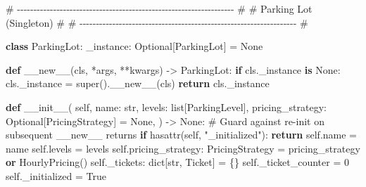 \documentclass[11pt]{article}
\newenvironment{Shaded}{\begin{snugshade}}{\end{snugshade}}
\newcommand{\BuiltInTok}[1]{\textcolor[rgb]{0.50,0.55,0.55}{#1}}
\newcommand{\CommentTok}[1]{\textcolor[rgb]{0.48,0.49,0.49}{#1}}
\newcommand{\ControlFlowTok}[1]{\textcolor[rgb]{0.99,0.74,0.29}{\textbf{#1}}}
\newcommand{\DecValTok}[1]{\textcolor[rgb]{0.96,0.45,0.00}{#1}}
\newcommand{\FunctionTok}[1]{\textcolor[rgb]{0.56,0.27,0.68}{#1}}
\newcommand{\KeywordTok}[1]{\textcolor[rgb]{0.81,0.81,0.76}{\textbf{#1}}}
\newcommand{\NormalTok}[1]{\textcolor[rgb]{0.81,0.81,0.76}{#1}}
\newcommand{\OperatorTok}[1]{\textcolor[rgb]{0.81,0.81,0.76}{#1}}
\newcommand{\StringTok}[1]{\textcolor[rgb]{0.96,0.31,0.31}{#1}}
\newcommand{\VariableTok}[1]{\textcolor[rgb]{0.15,0.68,0.68}{#1}}
\begin{document}
\begin{Shaded}
\begin{Highlighting}[]
\CommentTok{\# {-}{-}{-}{-}{-}{-}{-}{-}{-}{-}{-}{-}{-}{-}{-}{-}{-}{-}{-}{-}{-}{-}{-}{-}{-}{-}{-}{-}{-}{-}{-}{-}{-}{-}{-}{-}{-}{-}{-}{-}{-}{-}{-}{-}{-}{-}{-}{-}{-}{-}{-}{-}{-}{-}{-}{-}{-}{-}{-}{-}{-}{-}{-}{-}{-}{-} \#}
\CommentTok{\# Parking Lot (Singleton)                                             \#}
\CommentTok{\# {-}{-}{-}{-}{-}{-}{-}{-}{-}{-}{-}{-}{-}{-}{-}{-}{-}{-}{-}{-}{-}{-}{-}{-}{-}{-}{-}{-}{-}{-}{-}{-}{-}{-}{-}{-}{-}{-}{-}{-}{-}{-}{-}{-}{-}{-}{-}{-}{-}{-}{-}{-}{-}{-}{-}{-}{-}{-}{-}{-}{-}{-}{-}{-}{-}{-} \#}

\KeywordTok{class}\NormalTok{ ParkingLot:}
\NormalTok{    \_instance: Optional[ParkingLot] }\OperatorTok{=} \VariableTok{None}

    \KeywordTok{def} \FunctionTok{\_\_new\_\_}\NormalTok{(cls, }\OperatorTok{*}\NormalTok{args, }\OperatorTok{**}\NormalTok{kwargs) }\OperatorTok{{-}\textgreater{}}\NormalTok{ ParkingLot:}
        \ControlFlowTok{if}\NormalTok{ cls.\_instance }\KeywordTok{is} \VariableTok{None}\NormalTok{:}
\NormalTok{            cls.\_instance }\OperatorTok{=} \BuiltInTok{super}\NormalTok{().}\FunctionTok{\_\_new\_\_}\NormalTok{(cls)}
        \ControlFlowTok{return}\NormalTok{ cls.\_instance}

    \KeywordTok{def} \FunctionTok{\_\_init\_\_}\NormalTok{(}
        \VariableTok{self}\NormalTok{,}
\NormalTok{        name: }\BuiltInTok{str}\NormalTok{,}
\NormalTok{        levels: }\BuiltInTok{list}\NormalTok{[ParkingLevel],}
\NormalTok{        pricing\_strategy: Optional[PricingStrategy] }\OperatorTok{=} \VariableTok{None}\NormalTok{,}
\NormalTok{    ) }\OperatorTok{{-}\textgreater{}} \VariableTok{None}\NormalTok{:}
        \CommentTok{\# Guard against re{-}init on subsequent \_\_new\_\_ returns}
        \ControlFlowTok{if} \BuiltInTok{hasattr}\NormalTok{(}\VariableTok{self}\NormalTok{, }\StringTok{"\_initialized"}\NormalTok{):}
            \ControlFlowTok{return}
        \VariableTok{self}\NormalTok{.name }\OperatorTok{=}\NormalTok{ name}
        \VariableTok{self}\NormalTok{.levels }\OperatorTok{=}\NormalTok{ levels}
        \VariableTok{self}\NormalTok{.pricing\_strategy: PricingStrategy }\OperatorTok{=}\NormalTok{ pricing\_strategy }\KeywordTok{or}\NormalTok{ HourlyPricing()}
        \VariableTok{self}\NormalTok{.\_tickets: }\BuiltInTok{dict}\NormalTok{[}\BuiltInTok{str}\NormalTok{, Ticket] }\OperatorTok{=}\NormalTok{ \{\}}
        \VariableTok{self}\NormalTok{.\_ticket\_counter }\OperatorTok{=} \DecValTok{0}
        \VariableTok{self}\NormalTok{.\_initialized }\OperatorTok{=} \VariableTok{True}


\end{Highlighting}
\end{Shaded}
\end{document}
